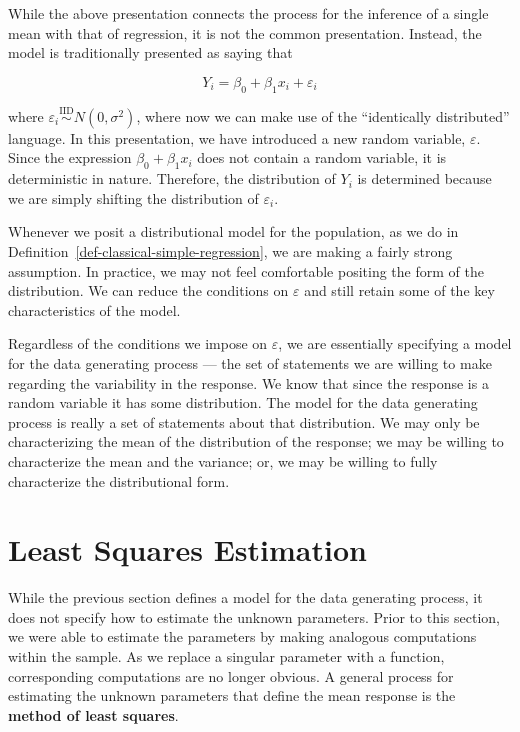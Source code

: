 \documentclass[
  letterpaper,
  DIV=11,
  numbers=noendperiod]{scrreprt}
\theoremstyle{plain}
\theoremstyle{definition}
\theoremstyle{definition}
\theoremstyle{remark}
\begin{document}
While the above presentation connects the process for the inference of a
single mean with that of regression, it is not the common presentation.
Instead, the model is traditionally presented as saying that

\[Y_i = \beta_0 + \beta_1 x_i + \varepsilon_i\]

where
\(\varepsilon_i \stackrel{\text{IID}}{\sim} N\left(0, \sigma^2\right)\),
where now we can make use of the ``identically distributed'' language.
In this presentation, we have introduced a new random variable,
\(\varepsilon\). Since the expression \(\beta_0 + \beta_1 x_i\) does not
contain a random variable, it is deterministic in nature. Therefore, the
distribution of \(Y_i\) is determined because we are simply shifting the
distribution of \(\varepsilon_i\).

Whenever we posit a distributional model for the population, as we do in
Definition~\ref{def-classical-simple-regression}, we are making a fairly
strong assumption. In practice, we may not feel comfortable positing the
form of the distribution. We can reduce the conditions on
\(\varepsilon\) and still retain some of the key characteristics of the
model.

Regardless of the conditions we impose on \(\varepsilon\), we are
essentially specifying a model for the data generating process --- the
set of statements we are willing to make regarding the variability in
the response. We know that since the response is a random variable it
has some distribution. The model for the data generating process is
really a set of statements about that distribution. We may only be
characterizing the mean of the distribution of the response; we may be
willing to characterize the mean and the variance; or, we may be willing
to fully characterize the distributional form.

\hypertarget{least-squares-estimation}{%
\section{Least Squares Estimation}\label{least-squares-estimation}}

While the previous section defines a model for the data generating
process, it does not specify how to estimate the unknown parameters.
Prior to this section, we were able to estimate the parameters by making
analogous computations within the sample. As we replace a singular
parameter with a function, corresponding computations are no longer
obvious. A general process for estimating the unknown parameters that
define the mean response is the \textbf{method of least squares}.
\end{document}
